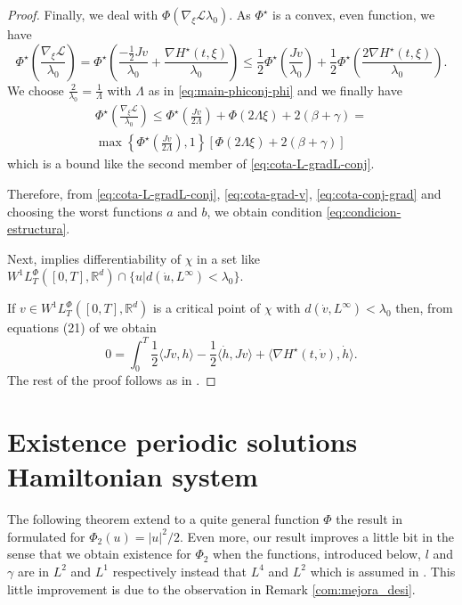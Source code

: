 \documentclass[twoside]{article}
\theoremstyle{remark}
\newcommand{\lphi}{L^{\Phi}}
\newcommand{\wphit}{W^{1}\lphi_T}
\newcommand{\rr}{\mathbb{R}}
\renewcommand{\leq}{\leqslant}
\begin{document}
\begin{proof}
Finally, we deal with $\Phi(\nabla_{\xi}\mathcal{L}{\lambda_0})$. 
As $\Phi^{\star}$ is a convex, even function, we have
\[\Phi^{\star}\left(\frac{\nabla_{\xi}\mathcal{L}}{\lambda_0}\right)=
\Phi^{\star}\left(\frac{-\frac{1}{2}Jv}{\lambda_0}+\frac{\nabla H^{\star}(t,\xi)}{\lambda_0}\right)
\leq
\frac{1}{2} \Phi^{\star}\left(\frac{Jv}{\lambda_0}\right)+
\frac{1}{2}\Phi^{\star}\left(\frac{2 \nabla H^{\star}(t,\xi)}{\lambda_0}\right).
\]
We choose $\frac{2}{\lambda_0}=\frac{1}{\Lambda}$ with $\Lambda$ as in \eqref{eq:main-phiconj-phi} and 
we finally have
\begin{equation}\label{eq:cota-conj-grad}
\begin{split}
\Phi^{\star}\left(\frac{\nabla_{\xi}\mathcal{L}}{\lambda_0}\right)\leq 
\Phi^{\star}\left(\frac{Jv}{2\Lambda}\right)+\Phi(2\Lambda\xi)+2(\beta+\gamma)=\\
\max\left\{\Phi^{\star}\left(\frac{Jv}{2\Lambda}\right),1\right\}
\left[\Phi(2\Lambda\xi)+2(\beta+\gamma)\right]
\end{split}
\end{equation}
which is a bound like the second member of \eqref{eq:cota-L-gradL-conj}.

Therefore, from \eqref{eq:cota-L-gradL-conj}, \eqref{eq:cota-grad-v}, \eqref{eq:cota-conj-grad} and choosing the worst functions $a$ and $b$, 
we obtain condition \eqref{eq:condicion-estructura}.

Next, \cite[Thm. 4.5]{MA2017} implies differentiability of $\chi$ in a set like 
$\wphit([0,T],\rr^d)\cap\{u|d(\dot{u},L^{\infty})<\lambda_0\}$.

If $v \in \wphit([0,T],\rr^d)$ is a critical point of $\chi$ with $d(\dot{v},L^{\infty})<\lambda_0$
then, from equations (21) of \cite{MA2017} we obtain
\[
0=\int_0^T \frac{1}{2} \langle J\dot{v},h\rangle-\frac{1}{2} \langle \dot{h},Jv \rangle
+\langle \nabla H^{\star}(t,\dot{v}),\dot{h} \rangle.
\]
The rest of the proof follows as in \cite{mawhin2010critical}.

\end{proof}

\section{Existence periodic solutions Hamiltonian system}

The following theorem extend  to a quite general function $\Phi$ the result in \cite[Th. 3.1]{mawhin2010critical} formulated for $\Phi_2(u)=|u|^2/2$. Even more, our result improves a little bit  \cite[Th. 3.1]{mawhin2010critical} in the sense that we obtain existence for $\Phi_2$ when the functions, introduced below, $l$ and $\gamma$ are in $L^2$ and $L^1$ respectively instead that $L^4$ and $L^2$  which is assumed in
\cite[Th. 3.1]{mawhin2010critical}. This little improvement is due to the observation in Remark \ref{com:mejora_desi}.
\end{document}
